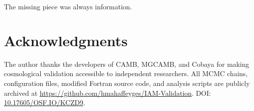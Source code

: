 \documentclass[12pt,letterpaper]{article}
\begin{document}
The missing piece was always information.

\section*{Acknowledgments}

The author thanks the developers of CAMB, MGCAMB, and Cobaya for making
cosmological validation accessible to independent researchers. All MCMC
chains, configuration files, modified Fortran source code, and analysis
scripts are publicly archived at
\url{https://github.com/hmahaffeyges/IAM-Validation}.
DOI: \href{https://doi.org/10.17605/OSF.IO/KCZD9}{10.17605/OSF.IO/KCZD9}.


\end{document}

